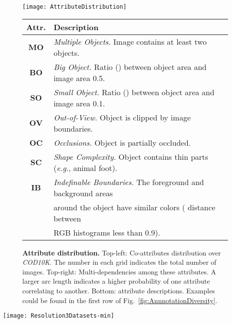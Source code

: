 \documentclass[10pt,journal,compsoc]{IEEEtran}
\def\eg{\emph{e.g.}}
\newcommand{\figref}[1]{Fig.~\ref{#1}}
\newcommand{\Rev}[1]{\textcolor{black}{#1}}
\def\ourdataset{\textit{COD10K}}
\begin{document}
\begin{figure}[t!]
  \centering
  \texttt{[image: AttributeDistribution]}\\
  \vspace{4pt}
  \footnotesize
  \renewcommand{\arraystretch}{0.9}
 \begin{tabular*}{\linewidth}{cl} \hline \toprule
  Attr. & Description\\
  \midrule
  \textbf{MO} & \emph{Multiple Objects.} Image contains at least two objects.\\
  \textbf{BO} & \emph{Big Object.} Ratio () between object area 
                and image area 0.5.\\
  \textbf{SO} & \emph{Small Object.} Ratio () between object area 
                and image area 0.1.\\
  \textbf{OV} & \emph{Out-of-View.} Object is clipped by image boundaries.\\
  \textbf{OC} & \emph{Occlusions.} Object is partially occluded.\\
  \textbf{SC} & \emph{Shape Complexity.} Object contains thin parts 
                (\eg, animal foot).\\
  \textbf{IB} & \emph{Indefinable Boundaries.} 
                The foreground and background areas\\
              & around the object have similar colors ( distance 
                 between\\
              & RGB histograms less than 0.9).\\
\hline \toprule
 \end{tabular*}
  \vspace{-8pt}
  \caption{\textbf{Attribute distribution.}
    Top-left: Co-attributes distribution over \ourdataset. 
    The number in each grid indicates the total number of images.
    Top-right: Multi-dependencies among these attributes.
    A larger arc length indicates a higher probability of one attribute 
    correlating to another.
    Bottom: attribute descriptions. 
    Examples could be found in the first row of 
    \figref{fig:AnnnotationDiversity}.
  }\label{fig:attributeDistribution}
\end{figure}

\begin{figure*}[t!]
  \centering
  \texttt{[image: Resolution3Datasets-min]}\\
  \vspace{-12pt}
  \caption{\textbf{Image resolution \Rev{(unit for the axis: pixel)} distribution of COD datasets.}
    From left to right: 
    CHAMELEON~\cite{2018Animal},
    CAMO-COCO~\cite{le2019anabranch} and \ourdataset~datasets.
  }\label{fig:Resolution3Datasets}
\end{figure*}
\end{document}
